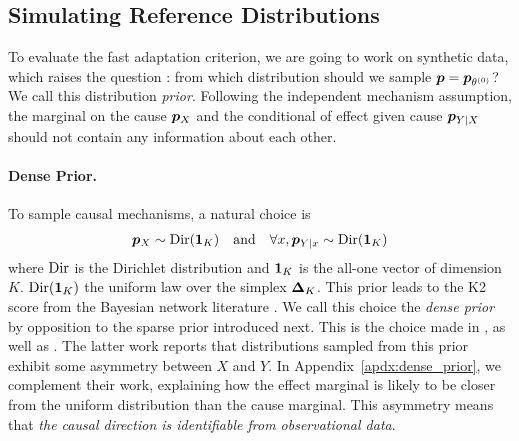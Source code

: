 \subsection{Simulating Reference Distributions}
\label{sec:categorical_initialization}
To evaluate the fast adaptation criterion, we are going to work on synthetic data, which raises the question : from which distribution should we sample $\bm{p} = \bm{p}_{\theta^{(0)}}$? 
We call this distribution \emph{prior}.
Following the independent mechanism assumption, the marginal on the cause ${\bm{p}}_X$ and  the conditional of effect given cause ${\bm{p}}_{Y|X}$ should not contain any information about each other. 
\paragraph{Dense Prior.}
To sample causal mechanisms, a natural choice is
\begin{align}
    \label{eq:dense_prior}
    {\bm{p}}_X \sim \mathrm{Dir}(\operatorname{\mathbf{1}}_K) 
    \quad \text{and} \quad
    \forall x, {\bm{p}}_{Y|x} \sim \mathrm{Dir}(\operatorname{\mathbf{1}}_K)
\end{align}
where $\mathrm{Dir}$ is the Dirichlet distribution and $\operatorname{\mathbf{1}}_K$ is the all-one vector of dimension $K$.
$\mathrm{Dir}(\operatorname{\mathbf{1}}_K)$ the uniform law over the simplex $\bm{\Delta}_K$.
This prior leads to the K2 score from the Bayesian network literature \citep{cooper1991bayesian}. 
We call this choice the \emph{dense prior} by opposition to the sparse prior introduced next.
This is the choice made in \citet{bengio2019meta}, as well as \citet{chalupka2016estimating}. 
The latter work reports that distributions sampled from this prior exhibit some asymmetry between $X$ and $Y$.
In Appendix~\ref{apdx:dense_prior}, we complement their work, explaining how the effect marginal is likely to be closer from the uniform distribution than the cause marginal.
This asymmetry means that \textit{the causal direction  is identifiable from observational data}.  

